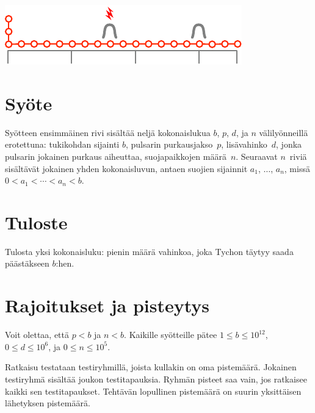 \includegraphics[width=.4\textwidth]{img/sample3.pdf}

\section*{Syöte}

Syötteen ensimmäinen rivi sisältää neljä kokonaislukua $b$, $p$, $d$, ja $n$ 
välilyönneillä erotettuna:
tukikohdan sijainti $b$,
pulsarin purkausjakso~$p$,
lisävahinko~$d$, jonka pulsarin jokainen purkaus aiheuttaa,
suojapaikkojen määrä~$n$. 
Seuraavat $n$~riviä sisältävät jokainen yhden kokonaisluvun, 
antaen suojien sijainnit $a_1$, $\ldots$, $a_n$, missä 
$0<a_1<\cdots <a_n< b$. %

\section*{Tuloste}

Tulosta yksi kokonaisluku: pienin määrä vahinkoa, joka Tychon täytyy saada 
päästäkseen $b$:hen. 


\section*{Rajoitukset ja pisteytys}

Voit olettaa, että
$p < b$ %
ja 
$n < b$. %
Kaikille syötteille pätee
$1\leq b\leq 10^{12}$, %
$0\leq d \leq 10^6$, %
ja
$0\leq n \leq 10^5$. %

Ratkaisu testataan testiryhmillä, joista kullakin on oma pistemäärä.
Jokainen testiryhmä sisältää joukon testitapauksia.
Ryhmän pisteet saa vain, jos ratkaisee kaikki sen testitapaukset.
Tehtävän lopullinen pistemäärä on suurin yksittäisen lähetyksen pistemäärä.


